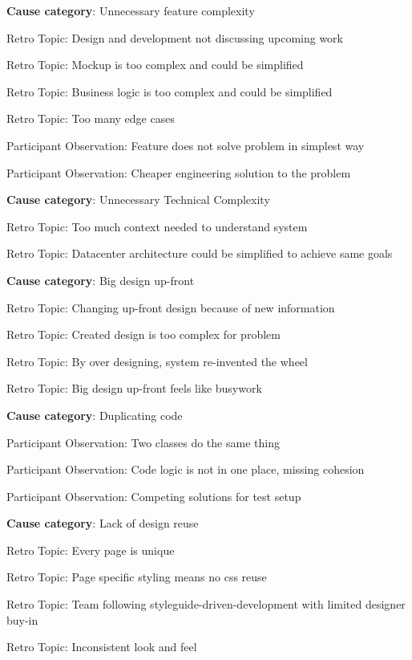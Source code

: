 \quad \textbf{Cause category}: Unnecessary feature complexity

\quad \quad Retro Topic: Design and development not discussing upcoming work

\quad \quad Retro Topic: Mockup is too complex and could be simplified

\quad \quad Retro Topic: Business logic is too complex and could be simplified

\quad \quad Retro Topic: Too many edge cases

\quad \quad Participant Observation: Feature does not solve problem in simplest way

\quad \quad Participant Observation: Cheaper engineering solution to the  problem

\quad \textbf{Cause category}: Unnecessary Technical Complexity

\quad \quad Retro Topic: Too much context needed to understand system

\quad \quad Retro Topic: Datacenter architecture could be simplified to achieve same goals

\quad \textbf{Cause category}: Big design up-front

\quad \quad Retro Topic: Changing up-front design because of new information

\quad \quad Retro Topic: Created design is too complex for problem

\quad \quad Retro Topic: By over designing, system re-invented the wheel

\quad \quad Retro Topic: Big design up-front feels like busywork

\quad \textbf{Cause category}: Duplicating code

\quad \quad Participant Observation: Two classes do the same thing

\quad \quad Participant Observation: Code logic is not in one place, missing cohesion

\quad \quad Participant Observation: Competing solutions for test setup

\quad \textbf{Cause category}: Lack of design reuse

\quad \quad Retro Topic: Every page is unique

\quad \quad Retro Topic: Page specific styling means no css reuse

\quad \quad Retro Topic: Team following styleguide-driven-development with limited designer buy-in

\quad \quad Retro Topic: Inconsistent look and feel



